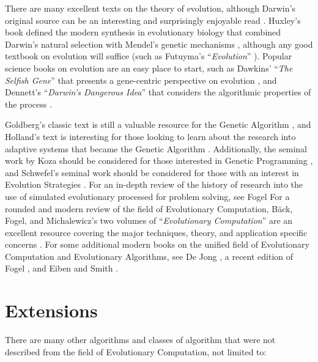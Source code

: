 \begin{bibunit}
There are many excellent texts on the theory of evolution, although Darwin's original source can be an interesting and surprisingly enjoyable read \cite{Darwin1859}. Huxley's book defined the modern synthesis in evolutionary biology that combined Darwin's natural selection with Mendel's genetic mechanisms \cite{Huxley1942}, although any good textbook on evolution will suffice (such as Futuyma's ``\emph{Evolution}'' \cite{Futuyma2009}). Popular science books on evolution are an easy place to start, such as Dawkins' ``\emph{The Selfish Gene}'' that presents a gene-centric perspective on evolution \cite{Dawkins1976}, and Dennett's ``\emph{Darwin's Dangerous Idea}'' that considers the algorithmic properties of the process \cite{Dennett1995}.

Goldberg's classic text is still a valuable resource for the Genetic Algorithm \cite{Goldberg1989}, and Holland's text is interesting for those looking to learn about the research into adaptive systems that became the Genetic Algorithm \cite{Holland1975}. Additionally, the seminal work by Koza should be considered for those interested in Genetic Programming \cite{Koza1992}, and Schwefel's seminal work should be considered for those with an interest in Evolution Strategies \cite{Schwefel1981}. For an in-depth review of the history of research into the use of simulated evolutionary processed for problem solving, see Fogel \cite{Fogel1998}
For a rounded and modern review of the field of Evolutionary Computation, B\"ack, Fogel, and Michalewicz's two volumes of ``\emph{Evolutionary Computation}'' are an excellent resource covering the major techniques, theory, and application specific concerns \cite{Baeck2000, Baeck2000a}.
For some additional modern books on the unified field of Evolutionary Computation and Evolutionary Algorithms, see De Jong \cite{Jong2006}, a recent edition of Fogel \cite{Fogel1995}, and Eiben and Smith \cite{Eiben2003}.

% 
% 
\section{Extensions}
There are many other algorithms and classes of algorithm that were not described from the field of Evolutionary Computation, not limited to:


\end{bibunit}
